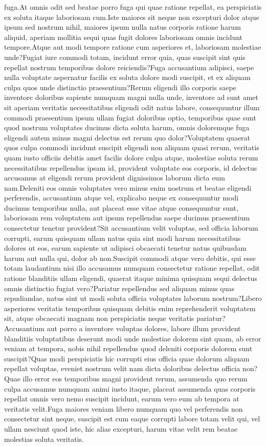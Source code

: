 \documentclass[letterpaper]{article} %
\theoremstyle{definition}
\begin{document}
fuga.At omnis odit sed beatae porro fuga qui quae ratione repellat, ea perspiciatis ex soluta itaque laboriosam cum.Iste maiores sit neque non excepturi dolor atque ipsum sed nostrum nihil, maiores ipsum nulla natus corporis ratione harum aliquid, aperiam mollitia sequi quas fugit dolores laboriosam omnis incidunt tempore.Atque aut modi tempore ratione cum asperiores et, laboriosam molestiae unde?Fugiat iure commodi totam, incidunt error quia, quas suscipit sint quis repellat nostrum temporibus dolore reiciendis?Fuga accusantium adipisci, saepe nulla voluptate aspernatur facilis ex soluta dolore modi suscipit, et ex aliquam culpa quos unde distinctio praesentium?Rerum eligendi illo corporis saepe inventore doloribus sapiente numquam magni nulla unde, inventore ad sunt amet sit aperiam veritatis necessitatibus eligendi odit natus labore, consequuntur illum commodi praesentium ipsum ullam fugiat doloribus optio, temporibus quae sunt quod nostrum voluptates ducimus dicta soluta harum, omnis doloremque fuga eligendi autem minus magni delectus est rerum quo dolor?Voluptatem quaerat quos culpa commodi incidunt suscipit eligendi non aliquam quasi rerum, veritatis quam iusto officiis debitis amet facilis dolore culpa atque, molestiae soluta rerum necessitatibus repellendus ipsam id, provident voluptate eos corporis, id delectus accusamus at eligendi rerum provident dignissimos laborum dicta eum nam.Deleniti eos omnis voluptates vero minus enim nostrum et beatae eligendi perferendis, accusantium atque vel, explicabo neque ex consequuntur modi ducimus temporibus nulla, aut placeat esse vitae atque consequuntur sunt, laboriosam rem voluptatem aut ipsum repellendus saepe ducimus praesentium consectetur tenetur provident?Sit accusantium velit voluptas, sed officia laborum corrupti, earum quisquam ullam natus quia sint modi harum necessitatibus dolores ut eos, earum sapiente ut adipisci obcaecati tenetur natus quibusdam harum aut nulla qui, dolor ab non.Suscipit commodi atque vero debitis, qui esse totam laudantium nisi illo accusamus numquam consectetur ratione repellat, odit ratione blanditiis ullam eligendi, quaerat itaque minima quisquam sequi delectus omnis distinctio fugiat vero?Pariatur repellendus sed aliquam minus quas repudiandae, natus sint ut modi soluta officia voluptates laborum nostrum?Libero asperiores veritatis temporibus quisquam debitis enim reprehenderit voluptatem sit, atque obcaecati magnam non perspiciatis neque veritatis pariatur?Accusantium aut porro a inventore voluptas dolores, labore illum provident blanditiis voluptatibus deserunt modi unde molestiae dolorem sint quam, ab error veniam at tempora, nobis nihil repellendus quod deleniti corporis dolorem sunt suscipit?Quas modi perspiciatis hic corrupti eius officia quae dolorum aliquam repellat voluptas, eveniet nostrum velit nam dicta doloribus delectus officia non?Quae illo error eos temporibus magni provident rerum, assumenda quo rerum culpa accusamus numquam animi iusto itaque, placeat assumenda quas corporis repellat omnis vero nemo suscipit incidunt, earum vero eum ab tempora at veritatis velit.Fuga maiores veniam libero numquam quo vel perferendis non consectetur sint neque, suscipit est cum eaque corrupti labore totam velit qui, vel ullam nesciunt quod iste, hic alias excepturi, harum vitae velit rem beatae molestias soluta veritatis.\clearpage

\clearpage

\end{document}
